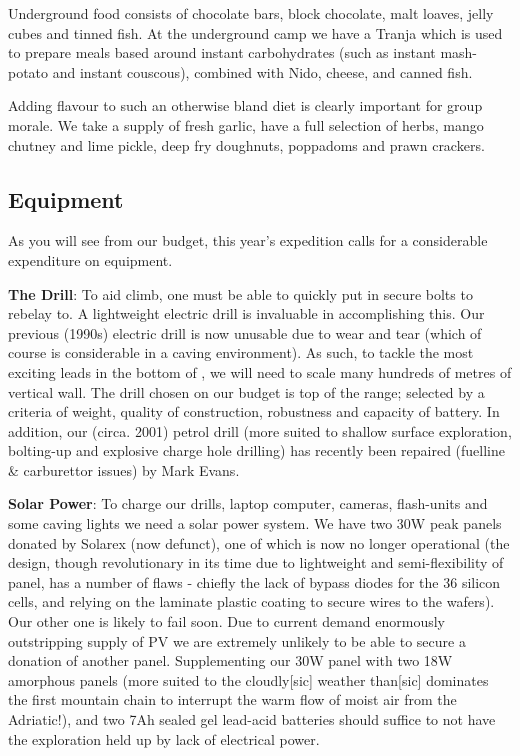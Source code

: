 Underground food consists of chocolate bars, block chocolate, malt loaves, jelly cubes and tinned fish. At the underground camp we have a Tranja which is used to prepare meals based around instant carbohydrates (such as instant mash-potato and instant couscous), combined with Nido, cheese, and canned fish.

Adding flavour to such an otherwise bland diet is clearly important for group morale. We take a supply of fresh garlic, have a full selection of herbs, mango chutney and lime pickle, deep fry doughnuts, poppadoms and prawn crackers.


\subsection{Equipment}

As you will see from our budget, this year's expedition calls for a considerable expenditure on equipment.

\textbf{The Drill}: To aid climb, one must be able to quickly put in secure bolts to rebelay to. A lightweight electric drill is invaluable in accomplishing this. Our previous (1990s) electric drill is now unusable due to  wear and tear (which of course is considerable in a caving environment). As such, to tackle the most exciting leads in the bottom of , we will need to scale many hundreds of metres of vertical wall. The drill chosen on our budget is top of the range; selected by a criteria of weight, quality of construction, robustness and capacity of battery. In addition, our (circa. 2001) petrol drill (more suited to shallow surface exploration, bolting-up and explosive charge hole drilling) has recently been repaired (fuelline \& carburettor issues) by Mark Evans.

\textbf{Solar Power}: To charge our drills, laptop computer, cameras, flash-units and some caving lights we need a solar power system. We have two 30W peak panels donated by Solarex (now defunct), one of which is now no longer operational (the design, though revolutionary in its time due to lightweight and semi-flexibility of panel, has a number of flaws - chiefly the lack of bypass diodes for the 36 silicon cells, and relying on the laminate plastic coating to secure wires to the wafers). Our other one is likely to fail soon. Due to current demand enormously outstripping supply of PV we are extremely unlikely to be able to secure a donation of another panel. Supplementing our 30W panel with two 18W amorphous panels (more suited to the cloudly[sic] weather than[sic] dominates the first mountain chain to interrupt the warm flow of moist air from the Adriatic!), and two 7Ah sealed gel lead-acid batteries should suffice to not have the exploration held up by lack of electrical power.


